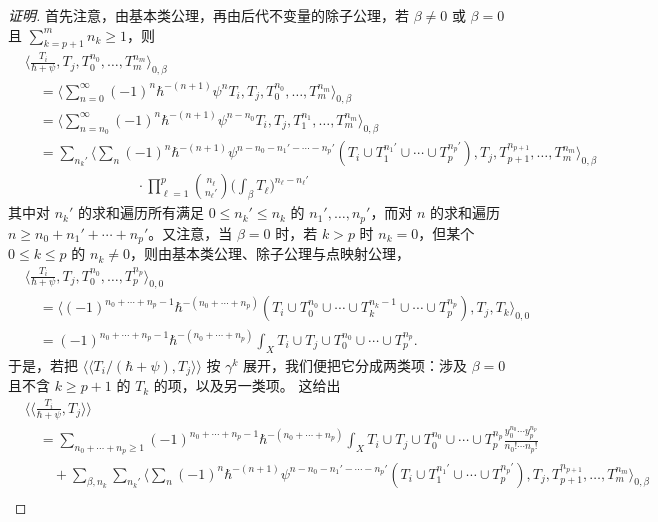 \begin{proof}[证明]
首先注意，由基本类公理，再由后代不变量的除子公理，若 $\beta\ne0$ 或 $\beta=0$ 且 $\sum_{k=p+1}^m n_k\ge1$，则
\begin{align*}
&\Big\langle\frac{T_i}{\hbar+\psi},T_j,T_0^{n_0},\dots,T_m^{n_m}\Big\rangle_{0,\beta}\\
&\quad=\Big\langle\sum_{n=0}^{\infty}(-1)^n\hbar^{-(n+1)}\psi^nT_i,T_j,T_0^{n_0},\dots,T_m^{n_m}\Big\rangle_{0,\beta}\\
&\quad=\Big\langle\sum_{n=n_0}^{\infty}(-1)^n\hbar^{-(n+1)}\psi^{n-n_0}T_i,T_j,T_1^{n_1},\dots,T_m^{n_m}\Big\rangle_{0,\beta}\\
&\quad=\sum_{n_k'}\Big\langle\sum_n(-1)^n\hbar^{-(n+1)}\psi^{n-n_0-n_1'-\cdots-n_p'}(T_i\cup T_1^{n_1'}\cup\cdots\cup T_p^{n_p'}),T_j,T_{p+1}^{n_{p+1}},\dots,T_m^{n_m}\Big\rangle_{0,\beta}\\
&\qquad\qquad\qquad\qquad\cdot\prod_{\ell=1}^p\binom{n_\ell}{n_\ell'}\Big(\int_\beta T_\ell\Big)^{n_\ell-n_\ell'}
\end{align*}
其中对 $n_k'$ 的求和遍历所有满足 $0\le n_k'\le n_k$ 的 $n_1',\dots,n_p'$，而对 $n$ 的求和遍历 $n\ge n_0+n_1'+\cdots+n_p'$。又注意，当 $\beta=0$ 时，若 $k>p$ 时 $n_k=0$，但某个 $0\le k\le p$ 的 $n_k\ne0$，则由基本类公理、除子公理与点映射公理，
\begin{align*}
&\Big\langle\frac{T_i}{\hbar+\psi},T_j,T_0^{n_0},\dots,T_p^{n_p}\Big\rangle_{0,0}\\
&\quad=\langle(-1)^{n_0+\cdots+n_p-1}\hbar^{-(n_0+\cdots+n_p)}(T_i\cup T_0^{n_0}\cup\cdots\cup T_k^{n_k-1}\cup\cdots\cup T_p^{n_p}),T_j,T_k\rangle_{0,0}\\
&\quad=(-1)^{n_0+\cdots+n_p-1}\hbar^{-(n_0+\cdots+n_p)}\int_X T_i\cup T_j\cup T_0^{n_0}\cup\cdots\cup T_p^{n_p}.
\end{align*}
于是，若把 $\langle\langle T_i/(\hbar+\psi),T_j\rangle\rangle$ 按 $\gamma^k$ 展开，我们便把它分成两类项：涉及 $\beta=0$ 且不含 $k\ge p+1$ 的 $T_k$ 的项，以及另一类项。
这给出
\begin{align*}
&\Big\langle\Big\langle\frac{T_i}{\hbar+\psi},T_j\Big\rangle\Big\rangle\\
&\quad=\sum_{n_0+\cdots+n_p\ge1}(-1)^{n_0+\cdots+n_p-1}\hbar^{-(n_0+\cdots+n_p)}\int_X T_i\cup T_j\cup T_0^{n_0}\cup\cdots\cup T_p^{n_p}\frac{y_0^{n_0}\cdots y_p^{n_p}}{n_0!\cdots n_p!}\\
&\quad\quad+\sum_{\beta,n_k}\sum_{n_k'}\Big\langle\sum_n(-1)^n\hbar^{-(n+1)}\psi^{n-n_0-n_1'-\cdots-n_p'}(T_i\cup T_1^{n_1'}\cup\cdots\cup T_p^{n_p'}),T_j,T_{p+1}^{n_{p+1}},\dots,T_m^{n_m}\Big\rangle_{0,\beta}\\

\end{align*}
\end{proof}
